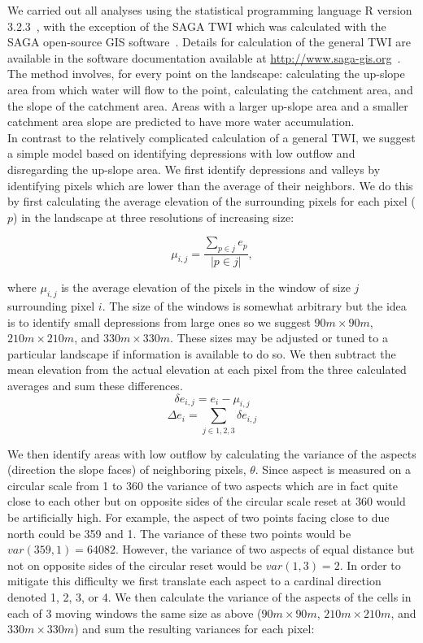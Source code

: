 \documentclass[10pt,letterpaper]{article}\usepackage[]{graphicx}\usepackage[]{color}
\begin{document}
We carried out all analyses using the statistical programming language R version 3.2.3~\cite{RCoreTeam2015}, with the exception of the SAGA TWI which was calculated with the SAGA open-source GIS software~\cite{Bohner2006}.  Details for calculation of the general TWI are available in the software documentation available at \href{http://www.saga-gis.org/saga_module_doc/2.1.4/ta_hydrology.html}{http://www.saga-gis.org}~\cite{Conrad2015}.  The method involves, for every point on the landscape:  calculating the up-slope area from which water will flow to the point,  calculating the catchment area, and the slope of the catchment area.  Areas with a larger up-slope area and a smaller catchment area slope are predicted to have more water accumulation.\\

In contrast to the relatively complicated calculation of a general TWI, we suggest a simple model based on identifying depressions with low outflow and disregarding the up-slope area.  We first identify depressions and valleys by identifying pixels which are lower than the average of their neighbors.  We do this by first calculating the average elevation of the surrounding pixels for each pixel ($p$) in the landscape at three resolutions of increasing size:  

$$\mu_{i,j} = \frac{\sum_{p \in j}e_p}{|p \in j|},$$

where $\mu_{i,j}$ is the average elevation of the pixels in the window of size $j$ surrounding pixel $i$.  The size of the windows is somewhat arbitrary but the idea is to identify small depressions from large ones so we suggest $90m \times 90m$, $210m \times 210m$, and $330m \times 330m$.  These sizes may be adjusted or tuned to a particular landscape if information is available to do so.  We then subtract the mean elevation from the actual elevation at each pixel from the three calculated averages and sum these differences.\\

$$\delta e_{i,j} = e_i - \mu_{i,j} $$
$$\Delta e_{i} = \sum_{j \in 1,2,3} \delta e_{i,j}$$

We then identify areas with low outflow by calculating the variance of the aspects (direction the slope faces) of neighboring pixels, $\theta$.  Since aspect is measured on a circular scale from 1 to 360 the variance of two aspects which are in fact quite close to each other but on opposite sides of the circular scale reset at 360 would be artificially high.  For example, the aspect of two points facing close to due north could be 359 and 1.  The variance of these two points would be $var(359,1)= 64082$.  However, the variance of two aspects of equal distance but not on opposite sides of the circular reset would be $var(1,3) = 2$.  In order to mitigate this difficulty we first translate each aspect to a cardinal direction denoted 1, 2, 3, or 4. We then calculate the variance of the aspects of the cells in each of 3 moving windows the same size as above ($90m \times 90m$, $210m \times 210m$, and $330m \times 330m$) and sum the resulting variances for each pixel:
\end{document}
